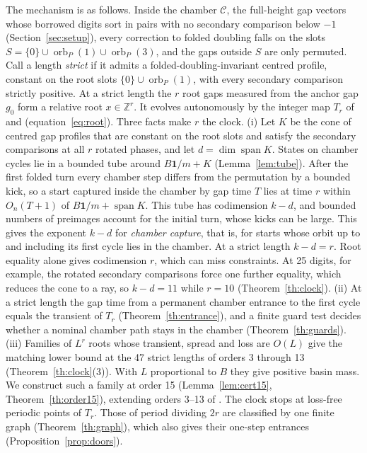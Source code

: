 \documentclass[11pt]{amsart}
\theoremstyle{definition}
\newcommand{\Z}{\mathbb Z}
\newcommand{\one}{\mathbf 1}
\newcommand{\C}{\mathcal C}
\begin{document}
The mechanism is as follows. Inside the chamber \(\C\), the full-height
gap vectors whose borrowed digits sort in pairs with no secondary
comparison below \(-1\) (Section~\ref{sec:setup}), every correction to
folded doubling falls on the slots
\(S=\{0\}\cup\operatorname{orb}_P(1)\cup\operatorname{orb}_P(3)\), and
the gaps outside \(S\) are only permuted. Call a length \emph{strict} if
it admits a folded-doubling-invariant centred profile, constant on the
root slots \(\{0\}\cup\operatorname{orb}_P(1)\), with every secondary
comparison strictly positive. At a strict length the \(r\) root gaps
measured from the anchor gap \(g_0\) form a relative root
\(x\in\Z^r\). It evolves autonomously by the integer map \(T_r\) of
\cite[Section~2.2]{G9} and \cite[Section~5]{G10}
(equation~\eqref{eq:root}). Three facts make \(r\) the clock.
(i) Let \(K\) be the cone of centred gap profiles that are constant on
the root slots and satisfy the secondary comparisons at all \(r\)
rotated phases, and let \(d=\dim\operatorname{span}K\). States on
chamber cycles lie in a bounded tube around \(B\one/m+K\)
(Lemma~\ref{lem:tube}). After the first folded turn every chamber step
differs from the permutation by a bounded kick, so a start captured
inside the chamber by gap time \(T\) lies at time \(r\) within
\(O_n(T+1)\) of \(B\one/m+\operatorname{span}K\). This tube has
codimension \(k-d\), and bounded numbers of preimages account for the
initial turn, whose kicks can be large. This gives the exponent
\(k-d\) for \emph{chamber capture}, that is, for starts whose orbit up
to and including its first cycle lies in the chamber. At a strict
length \(k-d=r\). Root equality alone gives codimension \(r\), which can miss
constraints. At 25 digits, for example, the rotated secondary comparisons force one further equality,
which reduces the cone to a ray, so \(k-d=11\) while \(r=10\)
(Theorem~\ref{th:clock}). (ii) At a strict
length the gap time from a permanent chamber entrance to the first cycle
equals the transient of \(T_r\) (Theorem~\ref{th:entrance}), and a
finite guard test decides whether a nominal chamber path stays in the
chamber (Theorem~\ref{th:guards}). (iii) Families of \(L^r\) roots whose
transient, spread and loss are \(O(L)\) give the matching lower bound at
the 47 strict lengths of orders 3 through 13
(Theorem~\ref{th:clock}(3)). With \(L\) proportional to \(B\) they give
positive basin mass. We construct such a family at order 15
(Lemma~\ref{lem:cert15}, Theorem~\ref{th:order15}), extending orders
3--13 of \cite{G9}. The clock stops at loss-free periodic points of
\(T_r\). Those of period dividing \(2r\) are classified by one finite
graph (Theorem~\ref{th:graph}), which also gives their one-step
entrances (Proposition~\ref{prop:doors}).
\end{document}
